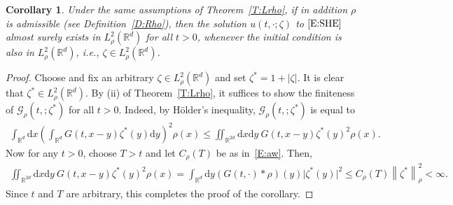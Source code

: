 \documentclass[sn-mathphys]{sn-jnl}%
\renewcommand{\R}{\mathbb{R}}
\newcommand{\Norm}[1]{\left\| #1 \right\|}
\newcommand{\ud}{\ensuremath{\mathrm{d}}}
\numberwithin{equation}{section}
\theoremstyle{thmstyleone}%
\newtheorem{corollary}[theorem]{Corollary}
\theoremstyle{thmstyletwo}%
\theoremstyle{thmstylethree}%
\begin{document}
\begin{corollary}\label{C:inclusion}
  Under the same assumptions of Theorem~\ref{T:Lrho}, if in addition $\rho$ is admissible (see
  Definition~\ref{D:Rho}), then the solution $u(t,\cdot;\zeta)$ to $\eqref{E:SHE}$ almost surely
  exists in $L^2_{\rho}(\R^d)$ for all $t>0$, whenever the initial condition is also in
  $L^2_{\rho}(\R^d)$, i.e., $\zeta\in L^2_{\rho}(\R^d)$.
\end{corollary}
\begin{proof}
  Choose and fix an arbitrary $\zeta \in L^2_{\rho}(\R^d)$ and set $\zeta^* = 1+\lvert\zeta\rvert$. It is clear
  that $\zeta^*\in L^2_\rho(\R^d)$. By (ii) of Theorem~\ref{T:Lrho}, it suffices to show the
  finiteness of $\mathcal{G}_{\rho}(t,;\zeta^*)$ for all $t>0$. Indeed, by H\"older's inequality,
  $\mathcal{G}_{\rho}(t,;\zeta^*)$ is equal to
  \begin{align*}
     \int_{\R^d} \ud x \left(\int_{\R^d} G(t,x-y) \zeta^* (y) \ud y\right)^2 \rho(x)
     \le \iint_{\R^{2d}} \ud x \ud y\:  G(t,x-y) \zeta^* (y)^2 \rho(x).
  \end{align*}
  Now for any $t>0$, choose $T>t$ and let $C_{\rho}(T)$ be as in~\eqref{E:aw}. Then,
  \begin{align*}
    \iint_{\R^{2d}} \ud x \ud y\: G(t,x-y) \zeta^* (y)^2 \rho(x)
    = \int_{\R^d} \ud y \left(G(t,\cdot)*\rho\right)(y) \lvert\zeta^*(y)\rvert^2
    \le C_{\rho}(T) \Norm{\zeta^*}_{\rho}^2 < \infty.
  \end{align*}
  Since $t$ and $T$ are arbitrary, this completes the proof of the corollary.
\end{proof}
\end{document}
